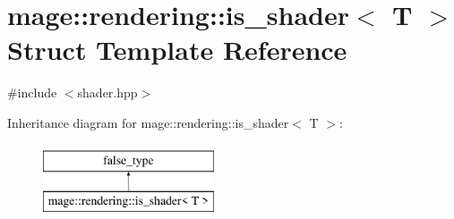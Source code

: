 \hypertarget{structmage_1_1rendering_1_1is__shader}{}\section{mage\+:\+:rendering\+:\+:is\+\_\+shader$<$ T $>$ Struct Template Reference}
\label{structmage_1_1rendering_1_1is__shader}


{\ttfamily \#include $<$shader.\+hpp$>$}

Inheritance diagram for mage\+:\+:rendering\+:\+:is\+\_\+shader$<$ T $>$\+:\begin{figure}[H]
\begin{center}
\leavevmode
\includegraphics[height=2.000000cm]{structmage_1_1rendering_1_1is__shader}
\end{center}
\end{figure}
